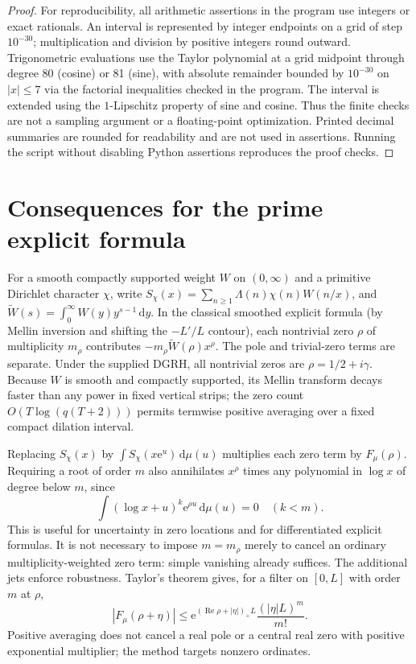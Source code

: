 \documentclass[11pt]{article}
\theoremstyle{remark}\newtheorem{remark}[theorem]{Remark}
\newcommand{\Rea}{\operatorname{Re}}\newcommand{\Ima}{\operatorname{Im}}\newcommand{\dd}{\,\mathrm d}
\newcommand{\e}{\mathrm e}\newcommand{\norm}[1]{\left\|#1\right\|}
\begin{document}
\begin{proof}
For reproducibility, all arithmetic assertions in the program use integers or exact rationals. An interval is represented by integer endpoints on a grid of step $10^{-30}$; multiplication and division by positive integers round outward. Trigonometric evaluations use the Taylor polynomial at a grid midpoint through degree 80 (cosine) or 81 (sine), with absolute remainder bounded by $10^{-30}$ on $|x|\le7$ via the factorial inequalities checked in the program. The interval is extended using the $1$-Lipschitz property of sine and cosine. Thus the finite checks are not a sampling argument or a floating-point optimization. Printed decimal summaries are rounded for readability and are not used in assertions. Running the script without disabling Python assertions reproduces the proof checks.
\end{proof}

\section{Consequences for the prime explicit formula}
For a smooth compactly supported weight $W$ on $(0,\infty)$ and a primitive Dirichlet character $\chi$, write $S_\chi(x)=\sum_{n\ge1}\Lambda(n)\chi(n)W(n/x)$, and $\widetilde W(s)=\int_0^\infty W(y)y^{s-1}\dd y$. In the classical smoothed explicit formula (by Mellin inversion and shifting the $-L'/L$ contour), each nontrivial zero $\rho$ of multiplicity $m_\rho$ contributes $-m_\rho\widetilde W(\rho)x^\rho$. The pole and trivial-zero terms are separate. Under the supplied DGRH, all nontrivial zeros are $\rho=1/2+i\gamma$. Because $W$ is smooth and compactly supported, its Mellin transform decays faster than any power in fixed vertical strips; the zero count $O(T\log(q(T+2)))$ permits termwise positive averaging over a fixed compact dilation interval.

Replacing $S_\chi(x)$ by $\int S_\chi(x\e^u)\dd\mu(u)$ multiplies each zero term by $F_\mu(\rho)$. Requiring a root of order $m$ also annihilates $x^\rho$ times any polynomial in $\log x$ of degree below $m$, since
\[
 \int (\log x+u)^k\e^{\rho u}\dd\mu(u)=0\quad(k<m).
\]
This is useful for uncertainty in zero locations and for differentiated explicit formulas. It is not necessary to impose $m=m_\rho$ merely to cancel an ordinary multiplicity-weighted zero term: simple vanishing already suffices. The additional jets enforce robustness. Taylor's theorem gives, for a filter on $[0,L]$ with order $m$ at $\rho$,
\[
 |F_\mu(\rho+\eta)|\le \e^{(\Rea\rho+|\eta|)_+L}\frac{(|\eta|L)^m}{m!}.
\]
Positive averaging does not cancel a real pole or a central real zero with positive exponential multiplier; the method targets nonzero ordinates.
\end{document}
